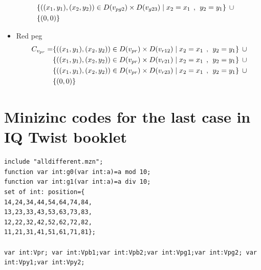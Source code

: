 \begin{appendices}
\begin{itemize}
\begin{align*}
\\&\{ ((x_{1},y_{1}),(x_{2},y_{2}))\in D(v_{pg2}) \times D(v_{g23})\mid x_{2} = x_{1} \hspace{1ex} , \hspace{1ex}  y_{2} = y_{1}\} \hspace{1ex} \cup 
\\&\{(0,0)\}
\end{align*}
  \item Red peg
  \begin{align*}
C_{v_{pr}} = &\{((x_{1},y_{1}),(x_{2},y_{2}))\in D(v_{pr}) \times D(v_{r12})\mid x_{2} = x_{1} \hspace{1ex} , \hspace{1ex}  y_{2} = y_{1}\} \hspace{1ex} \cup 
\\&\{((x_{1},y_{1}),(x_{2},y_{2}))\in D(v_{pr}) \times D(v_{r21})\mid x_{2} = x_{1} \hspace{1ex} , \hspace{1ex}  y_{2} = y_{1}\} \hspace{1ex} \cup 
\\&\{ ((x_{1},y_{1}),(x_{2},y_{2}))\in D(v_{pr}) \times D(v_{r23})\mid x_{2} = x_{1} \hspace{1ex} , \hspace{1ex}  y_{2} = y_{1}\}\hspace{1ex} \cup 
\\& \{(0,0)\}
\end{align*}
\end{itemize}
\section{Minizinc codes for the last case in IQ Twist booklet}
\label{appendix:finalcaseIQtwist}
\begin{lstlisting}[language=minizinc]
include "alldifferent.mzn";
function var int:g0(var int:a)=a mod 10;
function var int:g1(var int:a)=a div 10;
set of int: position={
14,24,34,44,54,64,74,84,
13,23,33,43,53,63,73,83,
12,22,32,42,52,62,72,82,
11,21,31,41,51,61,71,81};

var int:Vpr; var int:Vpb1;var int:Vpb2;var int:Vpg1;var int:Vpg2; var int:Vpy1;var int:Vpy2;


\end{lstlisting}
\end{appendices}
